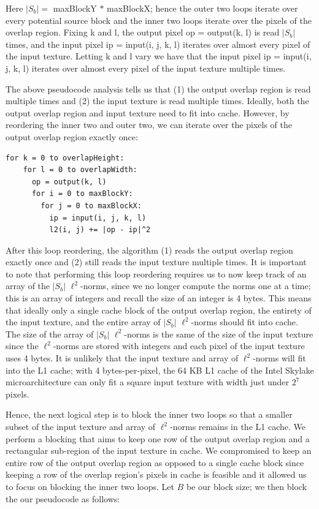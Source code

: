 \documentclass[letterpaper]{article}
\newcommand{\inline}[1]{{\ttfamily\hyphenchar\font=45 #1}}
\begin{document}
Here $|S_b| =$ maxBlockY $ * $ maxBlockX; hence the outer two loops iterate over every potential source block and the inner two loops iterate over the pixels of the overlap region. Fixing \inline{k} and \inline{l}, the output pixel \inline{op = output(k, l)} is read $|S_b|$ times, and the input pixel \inline{ip = input(i, j, k, l)} iterates over almost every pixel of the input texture. Letting \inline{k} and \inline{l} vary we have that the input pixel \inline{ip = input(i, j, k, l)} iterates over almost every pixel of the input texture multiple times. 

The above pseudocode analysis tells us that (1) the output overlap region is read multiple times and (2) the input texture is read multiple times. Ideally, both the output overlap region and input texture need to fit into cache. However, by reordering the inner two and outer two, we can iterate over the pixels of the output overlap region exactly once:

\begin{lstlisting}[style=cppstyle]
  for k = 0 to overlapHeight:
    for l = 0 to overlapWidth:
      op = output(k, l)
      for i = 0 to maxBlockY:
        for j = 0 to maxBlockX:
          ip = input(i, j, k, l)
          l2(i, j) += |op - ip|^2
\end{lstlisting}

After this loop reordering, the algorithm (1) reads the output overlap region exactly once and (2) still reads the input texture multiple times. It is important to note that performing this loop reordering requires us to now keep track of an array of the $|S_b|$ $\ell ^2$-norms, since we no longer compute the norms one at a time; this is an array of integers and recall the size of an integer is 4 bytes. This means that ideally only a single cache block of the output overlap region, the entirety of the input texture, and the entire array of $|S_b|$ $\ell ^2$-norms should fit into cache. The size of the array of $|S_b|$ $\ell ^2$-norms is the same of the size of the input texture since the $\ell ^2$-norms are stored with integers and each pixel of the input texture uses 4 bytes. It is unlikely that the input texture and array of $\ell ^2$-norms will fit into the L1 cache; with 4 bytes-per-pixel, the 64 KB L1 cache of the Intel Skylake microarchitecture can only fit a square input texture with width just under $2^7$ pixels.

Hence, the next logical step is to block the inner two loops so that a smaller subset of the input texture and array of $\ell ^2$-norms remains in the L1 cache. We perform a blocking that aims to keep one row of the output overlap region and a rectangular sub-region of the input texture in cache. We compromised to keep an entire row of the output overlap region as opposed to a single cache block since keeping a row of the overlap region's pixels in cache is feasible and it allowed us to focus on  blocking the inner two loops. Let $B$ be our block size; we then block the our pseudocode as follows:
\end{document}
